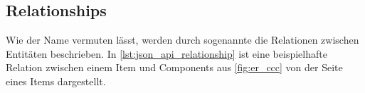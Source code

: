 \subsection{Relationships}
\label{sec:gj_relationships}

Wie der Name vermuten lässt, werden durch sogenannte
 die Relationen zwischen Entitäten
beschrieben.  In \cref{lst:json_api_relationship} ist eine beispielhafte
Relation zwischen einem Item und Components aus \cref{fig:er_ccc} von der Seite
eines Items dargestellt.


